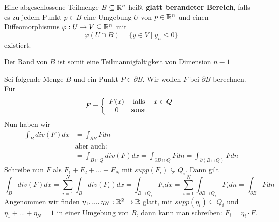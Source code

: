 \documentclass[main.tex]{subfiles}
\begin{document}
\begin{Definition}
  Eine abgeschlossene Teilmenge $B \subseteq \mathbb{R}^n$ heißt \textbf{glatt berandeter Bereich}, falls es zu jedem Punkt $p \in B$ eine Umgebung $U$ von $p \in \mathbb{R}^n$ und einen Diffeomorphismus $\varphi: U \to V \subseteq \mathbb{R}^n$ mit
  $$\varphi(U \cap B) = \{y \in V \mid y_n \leq 0\}$$
  existiert.

  Der Rand von $B$ ist somit eine Teilmannigfaltigkeit von Dimension $n - 1$
\end{Definition}

\begin{Beispiel}[Motivierung]
  Sei folgende Menge $B$ und ein Punkt $P \in \partial B$. Wir wollen $F$ bei $\partial B$ berechnen. Für
  $$F = \left\{\begin{array}{c c c}
    F(x) & \text{falls} & x \in Q \\
    0 & \text{sonst}
  \end{array}\right.$$
  Nun haben wir
  $$\begin{aligned}
    \int_B div(F) dx & = \int_{\partial B} F dn \\
    & \text{aber auch:} \\
    & = \int_{B \cap Q} div(F) dx = \int_{\partial B \cap Q} F dn = \int_{\partial (B \cap Q)} F dn
  \end{aligned}$$
  Schreibe nun $F$ als $F_1 + F_2 + ... + F_N$ mit $supp(F_i) \subsetneq Q_i$. Dann gilt
  $$\int_B div(F) dx = \sum \limits_{i=1}^N \int_B div(F_i) dx = \int_{B \cap Q_i} F_i dx = \sum \limits_{i=1}^N \int_{\partial B \cap Q_i} F_i dn = \int_{\partial B} F dn$$
  Angenommen wir finden $\eta_1 , ..., \eta_N : \mathbb{R}^2 \to \mathbb{R}$ glatt, mit $supp(\eta_i) \subseteq Q_i$ und $\eta_1 + ...+ \eta_N = 1$ in einer Umgebung von $B$, dann kann man schreiben: $F_i = \eta_i \cdot F$.
\end{Beispiel}
\end{document}
